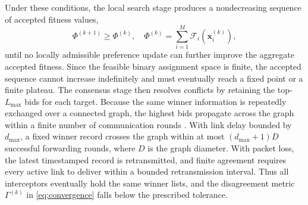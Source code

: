 \documentclass[lettersize,journal]{IEEEtran}
\providecommand{\DIFadd}[1]{{\protect\color{blue} #1}} %
\providecommand{\DIFdel}[1]{} %
\providecommand{\DIFaddbegin}{} %
\providecommand{\DIFaddend}{} %
\providecommand{\DIFdelbegin}{} %
\providecommand{\DIFdelend}{} %
\begin{document}
Under these conditions, the local search stage produces a nondecreasing sequence of accepted
fitness values,
\begin{equation}
\label{eq:fitness_monotonic}
\Phi^{(k+1)} \geq \Phi^{(k)}, \quad
\Phi^{(k)}=\sum_{i=1}^{M}\mathcal{F}_i(\mathbf{x}_i^{(k)}),
\end{equation}
until no locally admissible preference update can further improve the aggregate accepted
fitness. Since the feasible binary assignment space is finite, the accepted sequence cannot
increase indefinitely and must eventually reach a fixed point or a finite plateau. The
consensus stage then resolves conflicts by retaining the top-$L_{\max}$ bids for each target.
Because the same winner information is repeatedly exchanged over a connected graph, the
highest bids propagate across the graph within a finite number of communication rounds\DIFdelbegin \DIFdel{bounded by the graph diameter $D$. Thus, after at most $O(ND)$ winner-propagation roundsfor
all targets, all interceptors }\DIFdelend \DIFaddbegin \DIFadd{.
With link delay bounded by \(d_{\max}\), a fixed winner record crosses the
graph within at most \((d_{\max}+1)D\) successful forwarding rounds, where
\(D\) is the graph diameter. With packet loss, the latest timestamped record is
retransmitted, and finite agreement requires every active link to deliver
within a bounded retransmission interval. Thus all interceptors eventually
}\DIFaddend hold the same winner lists, and the disagreement metric
$\Gamma^{(k)}$ in \eqref{eq:convergence} falls below the prescribed tolerance.
\end{document}
